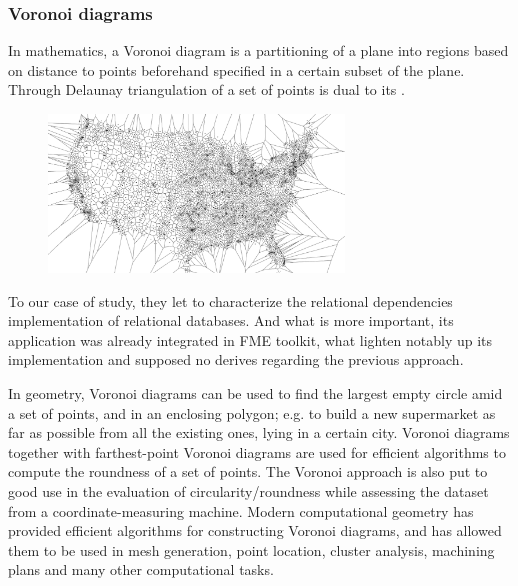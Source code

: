 \subsubsection{Voronoi diagrams}
\label{subsub:AIG:SLV:Voronoi}

In mathematics, a Voronoi diagram is a partitioning of a plane into regions based on distance to points beforehand specified in a certain subset of the plane. Through Delaunay triangulation of a set of points is dual to its . 

\begin{figure}[h]
    \centering
    \parbox[t]{0.7\textwidth}{
    {\centering
    \includegraphics[width=0.7\textwidth]{0.figuras/Usa_airports_voronoi_diagrams.png}}
    \label{fig:Voronoi-diagram}}
\end{figure}

To our case of study, they let to characterize the relational dependencies implementation of relational databases. And what is more important, its application was already integrated in FME toolkit, what lighten notably up its implementation and supposed no derives regarding the previous approach.

In geometry, Voronoi diagrams can be used to find the largest empty circle amid a set of points, and in an enclosing polygon; e.g. to build a new supermarket as far as possible from all the existing ones, lying in a certain city.
Voronoi diagrams together with farthest-point Voronoi diagrams are used for efficient algorithms to compute the roundness of a set of points. The Voronoi approach is also put to good use in the evaluation of circularity/roundness while assessing the dataset from a coordinate-measuring machine.
Modern computational geometry has provided efficient algorithms for constructing Voronoi diagrams, and has allowed them to be used in mesh generation, point location, cluster analysis, machining plans and many other computational tasks.


